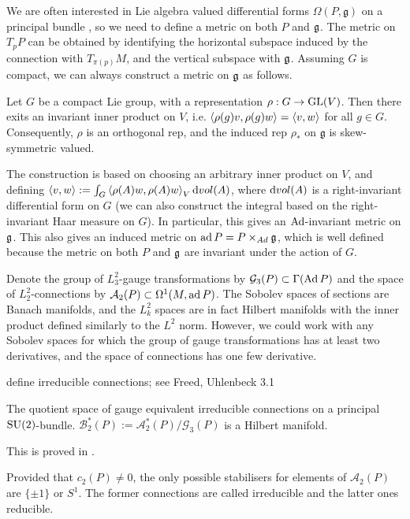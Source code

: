We are often interested in Lie algebra valued differential forms 
$\Omega(P,\mathfrak{g})$ on a principal bundle , so we need to define a metric 
on both $P$ and $\operatorname{\mathfrak{g}}$. The metric on $T_pP$ can be obtained by identifying the 
horizontal subspace induced by the connection with  $T_{\pi(p)}M$, and the vertical
subspace with $\operatorname{\mathfrak{g}}$. Assuming $G$ is compact, we can always construct a metric on
 $\operatorname{\mathfrak{g}}$ as follows.
 \begin{thm} \label{thm:lie_inner_product}
	Let $G$ be a compact Lie group, with a representation  $\rho : G \to\operatorname{GL}(V)$.
	Then there exits an invariant inner product on  $V$, i.e. 
	$\gen{\rho(g)v,\rho(g)w} = \gen{v,w}$ for all $g\in G$. Consequently,
	$\rho$ is an orthogonal rep, and the induced rep $\rho_*$ on
	$\mathfrak{g}$ is skew-symmetric valued. 
\end{thm}
The construction is based on choosing an arbitrary inner product on $V$, and
defining $\gen{v,w} := \int_G \gen{\rho(A)w,\rho(A)w}_V \odif{vol}(A)$, where
$\odif{vol}(A)$ is a right-invariant differential form on $G$ (we can also
construct the integral based on the right-invariant Haar measure on $G$).
In particular, this gives an $\operatorname{Ad}$-invariant metric on $\operatorname{\mathfrak{g}}$. 
This also gives an induced metric on $\operatorname{ad} P = P\times_{Ad}\operatorname{\mathfrak{g}}$, which is well 
defined because the metric on both $P$ and  $\operatorname{\mathfrak{g}}$ are invariant under the action 
of  $G$. 

Denote the group of $L^2_3$-gauge transformations by  $\mathcal{G}_3(P) \subset
\Gamma(\operatorname{Ad} P)$ and the space of $L^2_2$-connections by $\mathcal{A}_2(P) \subset
\Omega^1(M,\operatorname{ad} P)$. The Sobolev spaces of sections are Banach manifolds, and 
the $L^2_k$ spaces are in fact Hilbert manifolds with the inner product defined
similarly to the $L^2$ norm. However, we could work with
any Sobolev spaces for which the group of gauge transformations has at least two
derivatives, and the space of connections has one few derivative. 

define irreducible connections; see Freed, Uhlenbeck 3.1

\begin{thm} %
	The quotient space of gauge equivalent irreducible connections
    on a principal $\operatorname{SU}(2)$-bundle.
	$\mathcal{B}^*_2(P) := \mathcal{A}^*_2(P) / \mathcal{G}_3(P)$ is a 
	Hilbert manifold. 
\end{thm}
This is proved in \cite[Section 4.5]{morgan}. 

Provided that  $c_2(P)\neq 0$, the only possible stabilisers for elements of 
$\mathcal{A}_2(P)$ are $\{\pm 1\}$ or $S^1$. The former connections are called
irreducible and the latter ones reducible. 


